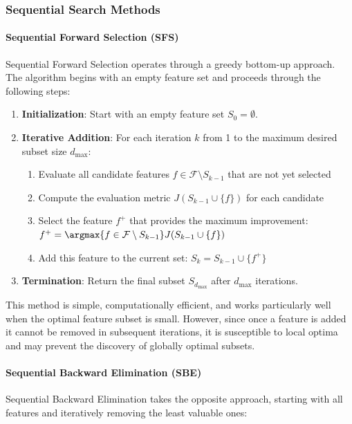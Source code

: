 \subsubsection*{Sequential Search Methods}

\paragraph{Sequential Forward Selection (SFS)}
Sequential Forward Selection operates through a greedy bottom-up approach. The algorithm begins with an empty feature set and proceeds through the following steps:

\begin{enumerate}
    \item \textbf{Initialization}: Start with an empty feature set $S_0 = \emptyset$.
    \item \textbf{Iterative Addition}: For each iteration $k$ from 1 to the maximum desired subset size $d_{\text{max}}$:
    \begin{enumerate}
        \item Evaluate all candidate features $f \in \mathcal{F} \setminus S_{k-1}$ that are not yet selected
        \item Compute the evaluation metric $J(S_{k-1} \cup \{f\})$ for each candidate
        \item Select the feature $f^+$ that provides the maximum improvement: $f^+ = \argmax{f \in \mathcal{F} \setminus S_{k-1}} J(S_{k-1} \cup \{f\})$
        \item Add this feature to the current set: $S_k = S_{k-1} \cup \{f^+\}$
    \end{enumerate}
    \item \textbf{Termination}: Return the final subset $S_{d_{\text{max}}}$ after $d_{\text{max}}$ iterations.
\end{enumerate}

This method is simple, computationally efficient, and works particularly well when the optimal feature subset is small. However, since once a feature is added it cannot be removed in subsequent iterations, it is susceptible to local optima and may prevent the discovery of globally optimal subsets.

\paragraph{Sequential Backward Elimination (SBE)}
Sequential Backward Elimination takes the opposite approach, starting with all features and iteratively removing the least valuable ones:

